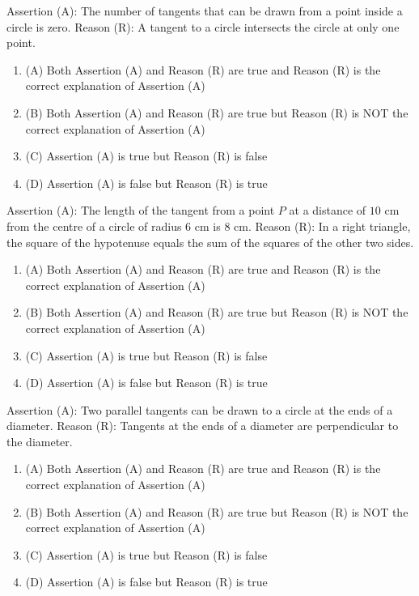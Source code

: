 \documentclass[12pt,a4paper]{exam}
\begin{document}
\begin{questions}
\question[1] Assertion (A): The number of tangents that can be drawn from a point inside a circle is zero.
Reason (R): A tangent to a circle intersects the circle at only one point.
\begin{enumerate}[label=(\Alph*)]
  \item (A) Both Assertion (A) and Reason (R) are true and Reason (R) is the correct explanation of Assertion (A)
  \item (B) Both Assertion (A) and Reason (R) are true but Reason (R) is NOT the correct explanation of Assertion (A)
  \item (C) Assertion (A) is true but Reason (R) is false
  \item (D) Assertion (A) is false but Reason (R) is true
\end{enumerate}
\vspace{0.15cm}

\question[1] Assertion (A): The length of the tangent from a point $P$ at a distance of $10 \text{ cm}$ from the centre of a circle of radius $6 \text{ cm}$ is $8 \text{ cm}$.
Reason (R): In a right triangle, the square of the hypotenuse equals the sum of the squares of the other two sides.
\begin{enumerate}[label=(\Alph*)]
  \item (A) Both Assertion (A) and Reason (R) are true and Reason (R) is the correct explanation of Assertion (A)
  \item (B) Both Assertion (A) and Reason (R) are true but Reason (R) is NOT the correct explanation of Assertion (A)
  \item (C) Assertion (A) is true but Reason (R) is false
  \item (D) Assertion (A) is false but Reason (R) is true
\end{enumerate}
\vspace{0.15cm}

\question[1] Assertion (A): Two parallel tangents can be drawn to a circle at the ends of a diameter.
Reason (R): Tangents at the ends of a diameter are perpendicular to the diameter.
\begin{enumerate}[label=(\Alph*)]
  \item (A) Both Assertion (A) and Reason (R) are true and Reason (R) is the correct explanation of Assertion (A)
  \item (B) Both Assertion (A) and Reason (R) are true but Reason (R) is NOT the correct explanation of Assertion (A)
  \item (C) Assertion (A) is true but Reason (R) is false
  \item (D) Assertion (A) is false but Reason (R) is true
\end{enumerate}
\vspace{0.15cm}


\end{questions}
\end{document}
